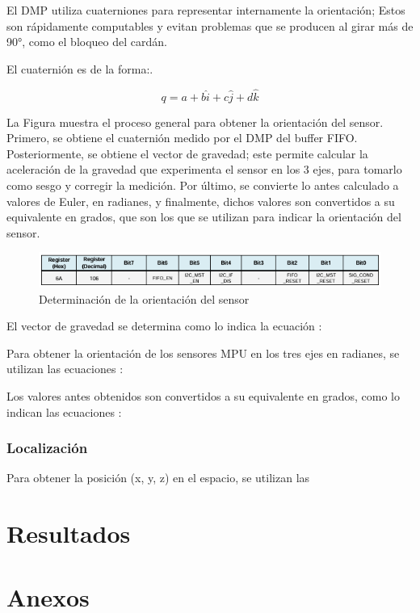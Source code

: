 \documentclass[12pt, twoside]{report}
\begin{document}
El DMP utiliza cuaterniones para representar internamente la orientación; Estos son rápidamente computables y evitan problemas que se producen al girar más de 90°, como el bloqueo del cardán.

El cuaternión \cite{cuaternion} es de la forma:.

\begin{equation}
q = a + b\hat{i} + c\hat{j} + d\hat{k}
\label{eq:eqcuaternion}
\end{equation}

La Figura muestra el proceso general para obtener la orientación del sensor. Primero, se obtiene el cuaternión medido por el DMP del buffer FIFO. Posteriormente, se obtiene el vector de gravedad; este permite calcular la aceleración de la gravedad que experimenta el sensor en los 3 ejes, para tomarlo como sesgo y corregir la medición. Por último, se convierte lo antes calculado a valores de Euler, en radianes, y finalmente, dichos valores son convertidos a su equivalente en grados, que son los que se utilizan para indicar la orientación del sensor.

\begin{figure}[htb]
	\centering
	\includegraphics[scale=1]{fifoenable.png}
	\caption{Determinación de la orientación del sensor}
	\label{fig:orientacion}
\end{figure}

El vector de gravedad se determina como lo indica la ecuación :

Para obtener la orientación de los sensores MPU en los tres ejes en radianes, se utilizan las ecuaciones :

Los valores antes obtenidos son convertidos a su equivalente en grados, como lo indican las ecuaciones : 

\subsection{Localización}

Para obtener la posición (x, y, z) en el espacio, se utilizan las

\newpage
\chapter{Resultados}

\newpage
\renewcommand{\bibname}{Referencias}



\newpage
\chapter{Anexos}\label{cap:anexos}

\end{document}
